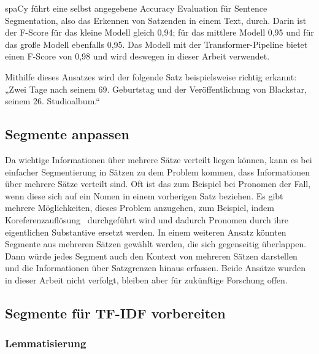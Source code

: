 spaCy führt eine selbst angegebene Accuracy Evaluation für Sentence Segmentation, also das Erkennen von Satzenden in einem Text, durch.
Darin ist der F-Score für das kleine Modell gleich 0,94; für das mittlere Modell 0,95 und für das große Modell ebenfalls 0,95.
Das Modell mit der Transformer-Pipeline bietet einen F-Score von 0,98 und wird deswegen in dieser Arbeit verwendet.~\cite{spacy2024}

Mithilfe dieses Ansatzes wird der folgende Satz beispielsweise richtig erkannt:
„Zwei Tage nach seinem 69. Geburtstag und der Veröffentlichung von Blackstar, seinem 26. Studioalbum.“


\subsection{Segmente anpassen}

Da wichtige Informationen über mehrere Sätze verteilt liegen können, kann es bei einfacher Segmentierung in Sätzen zu dem Problem kommen, dass Informationen über mehrere Sätze verteilt sind.
Oft ist das zum Beispiel bei Pronomen der Fall, wenn diese sich auf ein Nomen in einem vorherigen Satz beziehen.
Es gibt mehrere Möglichkeiten, dieses Problem anzugehen, zum Beispiel, indem Koreferenzauflösung~\cite{lee2017} durchgeführt wird und dadurch Pronomen durch ihre eigentlichen Substantive ersetzt werden.
In einem weiteren Ansatz könnten Segmente aus mehreren Sätzen gewählt werden, die sich gegenseitig überlappen.
Dann würde jedes Segment auch den Kontext von mehreren Sätzen darstellen und die Informationen über Satzgrenzen hinaus erfassen.
Beide Ansätze wurden in dieser Arbeit nicht verfolgt, bleiben aber für zukünftige Forschung offen.

\subsection{Segmente für TF-IDF vorbereiten}

\subsubsection{Lemmatisierung}

